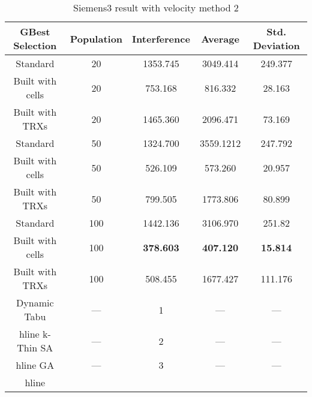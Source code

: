 \begin{table}[H]
\centering
	\begin{tabular}{| c | c | c | c | c |}
	\hline
	GBest Selection & Population & Interference & Average & Std. Deviation\\ \hline
	Standard & 20 & 1353.745 & 3049.414 & 249.377\\ \hline
	Built with cells & 20 & 753.168 & 816.332 & 28.163\\ \hline
	Built with TRXs & 20 & 1465.360 & 2096.471 & 73.169\\ \hline
	Standard & 50 & 1324.700 & 3559.1212 & 247.792\\ \hline
	Built with cells & 50 & 526.109 & 573.260 & 20.957\\ \hline
	Built with TRXs & 50 & 799.505 & 1773.806 & 80.899\\ \hline
	Standard & 100 & 1442.136 & 3106.970 & 251.82\\ \hline
	Built with cells & 100 & \textbf{378.603} & \textbf{407.120} & \textbf{15.814}\\ \hline
	Built with TRXs & 100 & 508.455 & 1677.427 & 111.176\\ \hline
    Dynamic Tabu & --- & 1 & --- & --- \\hline
    k-Thin SA & --- & 2 & --- & --- \\hline
    GA & --- & 3 & --- & --- \\hline
	\end{tabular}
\caption{Siemens3 result with velocity method 2}
\label{tab:siem3m2}
\end{table}
